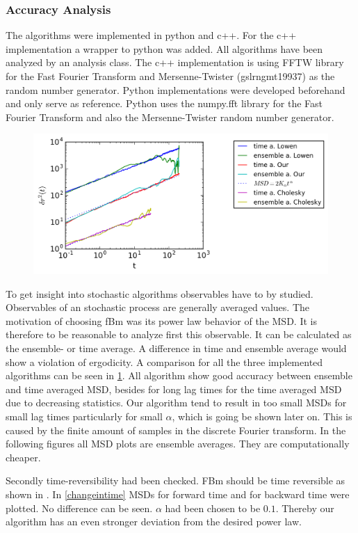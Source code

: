 \documentclass[
  a4paper,BCOR10mm,oneside,
  headsepline,footsepline,%
  fleqn,openbib
]{scrbook}
\begin{document}
\subsubsection{Accuracy Analysis}
The algorithms were implemented in python and c++. For the c++ implementation a wrapper to python was added. All algorithms have been analyzed by an analysis class. The c++ implementation is using FFTW library for the Fast Fourier Transform and Mersenne-Twister (gsl\texttt{\textunderscore}rng\texttt{\textunderscore}mt19937) as the random number generator. Python implementations were developed beforehand and only serve as reference. Python uses the numpy.fft library for the Fast Fourier Transform and also the Mersenne-Twister random number generator.\par
\begin{figure}[h!]
  \centering
  \includegraphics[width=\textwidth]{./data/timevsensambe.png}
  \captionsetup{width=\linewidth}
  \label{fig:4}
\end{figure}
To get insight into stochastic algorithms observables have to by studied. Observables of an stochastic process are generally averaged values. The motivation of choosing fBm was its power law behavior of the MSD. It is therefore to be reasonable to analyze first this observable. It can be calculated as the ensemble- or time average. A difference in time and ensemble average would show a violation of ergodicity. A comparison for all the three implemented algorithms can be seen in \cref{fig:4}. All algorithm show good accuracy between ensemble and time averaged MSD, besides for long lag times for the time averaged MSD due to decreasing statistics. Our algorithm tend to result in too  small MSDs for small lag times particularly for small $\alpha$, which is going be shown later on. This is caused by the finite amount of samples in the discrete Fourier transform. In the following figures all MSD plots are ensemble averages. They are computationally cheaper.\par Secondly time-reversibility had been checked. FBm should be time reversible as shown in \cite{Horvai2007}. In \cref{changeintime} MSDs for forward time and for backward time were plotted. No difference can be seen. $\alpha$ had been chosen to be $0.1$. Thereby our algorithm has an even stronger deviation from the desired power law.
\end{document}
